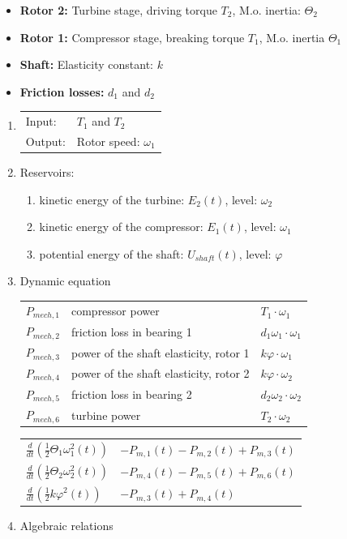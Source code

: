 \documentclass[10pt,a4paper]{scrartcl}
\begin{document}
\begin{multicols*}{3}

\scriptsize
\begin{itemize}
\item\textbf{Rotor 2:} Turbine stage, driving torque $T_2$, M.o. inertia: $\Theta_2$
\item\textbf{Rotor 1:} Compressor stage, breaking torque $T_1$, M.o. inertia $\Theta_1$
\item\textbf{Shaft:} Elasticity constant: $k$
\item\textbf{Friction losses:} $d_1$ and $d_2$
\end{itemize}
\normalsize


\begin{enumerate}
\item \begin{tabular}{ll}Input: & $T_1$ and $T_2$\\ Output: & Rotor speed: $\omega_1$\end{tabular}
\item Reservoirs:
\begin{enumerate}
\item kinetic energy of the turbine: $E_2(t)$, level: $\omega_2$
\item kinetic energy of the compressor: $E_1(t)$, level: $\omega_1$
\item potential energy of the shaft: $U_{shaft}(t)$, level: $\varphi$
\end{enumerate}
\item Dynamic equation

\small \begin{tabular}{l@{ = }l@{ = }l}
$P_{mech,1}$&compressor power& $T_1\cdot \omega_1$\\
$P_{mech,2}$&friction loss in bearing 1& $d_1\omega_1\cdot \omega_1$\\
$P_{mech,3}$&power of the shaft elasticity, rotor 1&$k\varphi\cdot\omega_1$\\
$P_{mech,4}$&power of the shaft elasticity, rotor 2&$k\varphi\cdot\omega_2$\\
$P_{mech,5}$&friction loss in bearing 2&$d_2\omega_2\cdot\omega_2$\\
$P_{mech,6}$&turbine power&$T_2\cdot\omega_2$
\end{tabular}
\normalsize

\vspace{3ex}

\begin{tabular}{l@{ = }l}
$\frac{d}{dt}\left(\frac{1}{2}\Theta_1\omega_1^2(t)\right)$&$-P_{m,1}(t)-P_{m,2}(t)+P_{m,3}(t)$\\
$\frac{d}{dt}\left(\frac{1}{2}\Theta_2\omega_2^2(t)\right)$&$-P_{m,4}(t)-P_{m,5}(t)+P_{m,6}(t)$\\
$\frac{d}{dt}\left(\frac{1}{2}k\varphi^2(t)\right)$&$-P_{m,3}(t)+P_{m,4}(t)$
\end{tabular}
\item Algebraic relations


\end{enumerate}
\end{multicols*}
\end{document}
